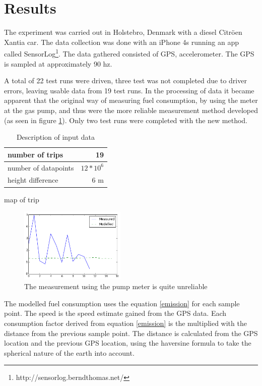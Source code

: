 \section{Results}
\label{sec:results}

The experiment was carried out in Holstebro, Denmark with a diesel Citr\"oen Xantia car. The data collection was done with an iPhone 4s running an app called SensorLog\footnote{http://sensorlog.berndthomas.net/}. The data gathered consisted of GPS, accelerometer. The GPS is sampled at approximately 90 hz.

A total of 22 test runs were driven, three test was not completed due to driver errors, leaving
usable data from 19 test runs. In the processing of data it became apparent that the original way of measuring fuel consumption, by using the meter at the gas pump, and thus were the more reliable measurement method developed (as seen in figure \ref{measured}). Only two test runs were completed with the new method.

\begin{table}
\begin{tabular}{| l | r |}
\hline 
number of trips & 19 \\[0.1cm] \hline
number of datapoints & $12*10^6$\\[0.1cm] \hline
height difference & 6 m\\[0.1cm]
\hline 

\end{tabular}
\label{datatable}
\caption{Description of input data}
\end{table}
map of trip

\begin{figure}[h]
	\centering
	\includegraphics[width=0.45\textwidth]{Measured_consumption}
  \caption{The measurement using the pump meter is quite unreliable}
  \label{measured}
\end{figure}

The modelled fuel consumption uses the equation \ref{emission} for each sample point. The speed is the speed estimate gained from the GPS data. Each consumption factor derived from  equation \ref{emission} is the multiplied with the distance from the previous sample point. The distance is calculated from the GPS location and the previous GPS location, using the haversine formula \cite{rick1999deriving} to take the spherical nature of the earth into account.

